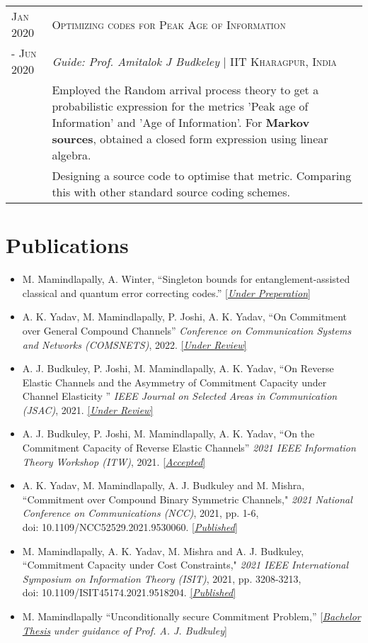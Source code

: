\documentclass[a4paper,10pt]{article}
\def \siteurl{https://manideepmamindlapally.github.io}
\begin{document}
\begin{tabular}{p{1.8cm}|p{15.3cm}}
\centering  \textsc{Jan 2020} & \textsc{Optimizing codes for Peak Age of Information}
  \\ \centering\textsc{- Jun 2020}&\emph{Guide: Prof. Amitalok J Budkeley} | \small{\textsc{IIT Kharagpur, India}}\\ &\footnotesize{ Employed the Random arrival process theory to get a probabilistic expression for the metrics 'Peak age of Information' and 'Age of Information'. For \textbf{Markov sources}, obtained a closed form expression using linear algebra.}\\
  &  \footnotesize{Designing a source code to optimise that metric. Comparing this with other standard source coding schemes.}
\end{tabular}

\section{Publications}
\begin{itemize}
\item M. Mamindlapally, A. Winter, ``Singleton bounds for entanglement-assisted classical and quantum error correcting codes.'' \href{\siteurl /assests/files/cv/cv.pdf}{\small{[\textit{Under Preperation}]}}
\item A. K. Yadav, M. Mamindlapally, P. Joshi, A. K. Yadav, ``On Commitment over General Compound Channels'' \textit{Conference on Communication Systems and Networks (COMSNETS)}, 2022. \href{https://www.comsnets.org/}{\small{[\textit{Under Review}]}}
\item A. J. Budkuley, P. Joshi, M. Mamindlapally, A. K. Yadav, ``On Reverse Elastic Channels and the Asymmetry of Commitment Capacity under Channel Elasticity
'' \textit{IEEE Journal on Selected Areas in Communication (JSAC)}, 2021. \href{https://www.comsoc.org/publications/journals/ieee-jsac}{\small{[\textit{Under Review}]}}
\item A. J. Budkuley, P. Joshi, M. Mamindlapally, A. K. Yadav, ``On the Commitment Capacity of Reverse Elastic Channels'' \textit{2021 IEEE Information Theory Workshop (ITW)}, 2021. \href{https://www.itsoc.org/event/itw-2021-kanazawa}{\small{[\textit{Accepted}]}}
\item A. K. Yadav, M. Mamindlapally, A. J. Budkuley and M. Mishra, ``Commitment over Compound Binary Symmetric Channels," \textit{2021 National Conference on Communications (NCC)}, 2021, pp. 1-6, \\ doi: 10.1109/NCC52529.2021.9530060. \href{https://doi.org/10.1109/NCC52529.2021.9530060}{\small{[\textit{Published}]}}
\item M. Mamindlapally, A. K. Yadav, M. Mishra and A. J. Budkuley, ``Commitment Capacity under Cost Constraints," \textit{2021 IEEE International Symposium on Information Theory (ISIT)}, 2021, pp. 3208-3213, \\ doi: 10.1109/ISIT45174.2021.9518204. \href{https://doi.org/10.1109/ISIT45174.2021.9518204}{\small{[\textit{Published}]}}
\item M. Mamindlapally ``Unconditionally secure Commitment Problem,'' [\href{\siteurl /assests/files/cv/cv.pdf}{\textit{Bachelor Thesis}}\textit{ under guidance of Prof. A. J. Budkuley}]
\end{itemize}
\end{document}
